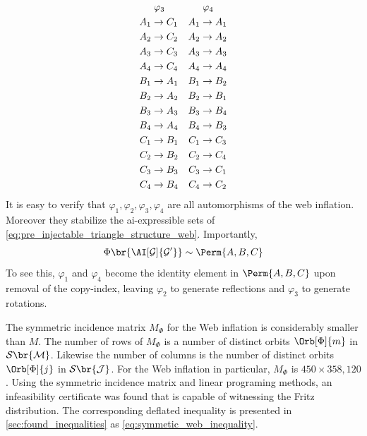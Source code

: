 \documentclass[aps, 10pt, english, twoside, pra, nofootinbib, tightenlines, longbibliography, superscriptaddress]{revtex4-1}
\renewcommand{\Events}[1]{\mathcal{S}\br{#1}} %
\begin{document}
\begin{equation*}
\begin{aligned}[c]
    &\hspace{1mm}\varphi_3 \\
    A_1 &\to C_1 \\A_2 &\to C_2 \\A_3 &\to C_3 \\A_4 &\to C_4 \\B_1 &\to A_1 \\B_2 &\to A_2 \\B_3 &\to A_3 \\B_4 &\to A_4 \\C_1 &\to B_1 \\C_2 &\to B_2 \\C_3 &\to B_3 \\C_4 &\to B_4
    \end{aligned}
    \quad
    \begin{aligned}[c]
    &\hspace{1mm}\varphi_4 \\
    A_1 &\to A_1 \\A_2 &\to A_2 \\A_3 &\to A_3 \\A_4 &\to A_4 \\B_1 &\to B_2 \\B_2 &\to B_1 \\B_3 &\to B_4 \\B_4 &\to B_3 \\C_1 &\to C_3 \\C_2 &\to C_4 \\C_3 &\to C_1 \\C_4 &\to C_2
    \end{aligned}
    \end{equation*}
    It is easy to verify that $\varphi_1, \varphi_2, \varphi_3, \varphi_4$ are all automorphisms of the web inflation. Moreover they stabilize the ai-expressible sets of \cref{eq:pre_injectable_triangle_structure_web}. Importantly,
    \[ \gp\br{\AI[\graph]{\graph'}} \sim \Perm{A,B,C} \]
    To see this, $\varphi_1$ and $\varphi_4$ become the identity element in $\Perm{A,B,C}$ upon removal of the copy-index, leaving $\varphi_2$ to generate reflections and $\varphi_3$ to generate rotations.

    The symmetric incidence matrix $M_{\Phi}$ for the Web inflation is considerably smaller than $M$. The number of rows of $M_{\Phi}$ is a number of distinct orbits $\Orb[\Phi]{m}$ in $\Events{\mscenario}$. Likewise the number of columns is the number of distinct orbits $\Orb[\Phi]{j}$ in $\Events{\jointvar}$. For the Web inflation in particular, $M_{\Phi}$ is $450 \times 358,120$. Using the symmetric incidence matrix and linear programing methods, an infeasibility certificate was found that is capable of witnessing the Fritz distribution. The corresponding deflated inequality is presented in \cref{sec:found_inequalities} as \cref{eq:symmetic_web_inequality}.
\end{document}
